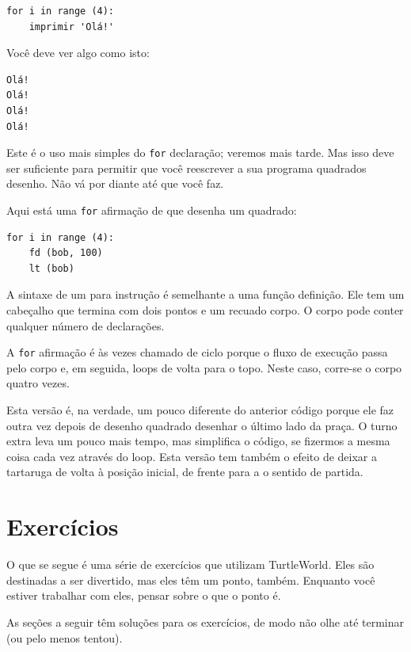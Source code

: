 \documentclass[10pt]{book}
\begin{document}
\begin{verbatim}
for i in range (4):
    imprimir 'Olá!'
\end{verbatim}
%
Você deve ver algo como isto:

\begin{verbatim}
Olá!
Olá!
Olá!
Olá!
\end{verbatim}
%
Este é o uso mais simples do {\tt for} declaração; veremos
mais tarde. Mas isso deve ser suficiente para permitir que você reescrever a sua
programa quadrados desenho. Não vá por diante até que você faz.

Aqui está uma {\tt for} afirmação de que desenha um quadrado:

\begin{verbatim}
for i in range (4):
    fd (bob, 100)
    lt (bob)
\end{verbatim}
%
A sintaxe de um {\tt} para instrução é semelhante a uma função
definição. Ele tem um cabeçalho que termina com dois pontos e um recuado
corpo. O corpo pode conter qualquer número de declarações.

A {\tt for} afirmação é às vezes chamado de ciclo {\bf} porque
o fluxo de execução passa pelo corpo e, em seguida, loops de volta
para o topo. Neste caso, corre-se o corpo quatro vezes.

Esta versão é, na verdade, um pouco diferente do anterior
código porque ele faz outra vez depois de desenho quadrado
desenhar o último lado da praça. O turno extra leva um pouco
mais tempo, mas simplifica o código, se fizermos a mesma coisa
cada vez através do loop. Esta versão tem também o efeito
de deixar a tartaruga de volta à posição inicial, de frente para a
o sentido de partida.

\section{Exercícios}

O que se segue é uma série de exercícios que utilizam TurtleWorld. Eles
são destinadas a ser divertido, mas eles têm um ponto, também. Enquanto você estiver
trabalhar com eles, pensar sobre o que o ponto é.

As seções a seguir têm soluções para os exercícios, de modo
não olhe até terminar (ou pelo menos tentou).
\end{document}
